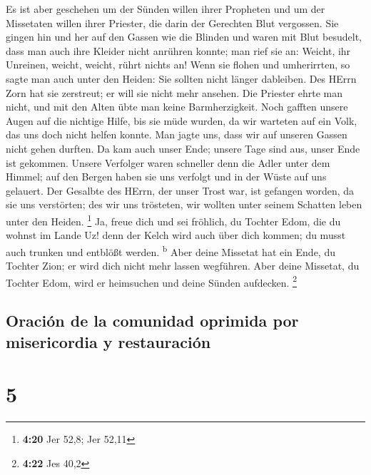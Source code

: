  Es ist aber geschehen um der Sünden willen ihrer
Propheten und um der Missetaten willen ihrer Priester, die darin der
Gerechten Blut vergossen.  Sie gingen hin und her auf den
Gassen wie die Blinden und waren mit Blut besudelt, dass man auch ihre
Kleider nicht anrühren konnte;  man rief sie an: Weicht,
ihr Unreinen, weicht, weicht, rührt nichts an! Wenn sie flohen und
umherirrten, so sagte man auch unter den Heiden: Sie sollten nicht
länger dableiben.  Des HErrn Zorn hat sie zerstreut; er
will sie nicht mehr ansehen. Die Priester ehrte man nicht, und mit den
Alten übte man keine Barmherzigkeit.  Noch gafften unsere
Augen auf die nichtige Hilfe, bis sie müde wurden, da wir warteten auf
ein Volk, das uns doch nicht helfen konnte.  Man jagte
uns, dass wir auf unseren Gassen nicht gehen durften. Da kam auch unser
Ende; unsere Tage sind aus, unser Ende ist gekommen. 
Unsere Verfolger waren schneller denn die Adler unter dem Himmel; auf
den Bergen haben sie uns verfolgt und in der Wüste auf uns gelauert.
 Der Gesalbte des HErrn, der unser Trost war, ist
gefangen worden, da sie uns verstörten; des wir uns trösteten, wir
wollten unter seinem Schatten leben unter den Heiden. \footnote{\textbf{4:20}
  Jer 52,8; Jer 52,11}  Ja, freue dich und sei fröhlich,
du Tochter Edom, die du wohnst im Lande Uz! denn der Kelch wird auch
über dich kommen; du musst auch trunken und entblößt werden.
\textsuperscript{b}  Aber deine Missetat hat ein Ende, du
Tochter Zion; er wird dich nicht mehr lassen wegführen. Aber deine
Missetat, du Tochter Edom, wird er heimsuchen und deine Sünden
aufdecken. \footnote{\textbf{4:22} Jes 40,2}

\hypertarget{oraciuxf3n-de-la-comunidad-oprimida-por-misericordia-y-restauraciuxf3n}{%
\subsection{Oración de la comunidad oprimida por misericordia y
restauración}\label{oraciuxf3n-de-la-comunidad-oprimida-por-misericordia-y-restauraciuxf3n}}

\hypertarget{section-4}{%
\section{5}\label{section-4}}

